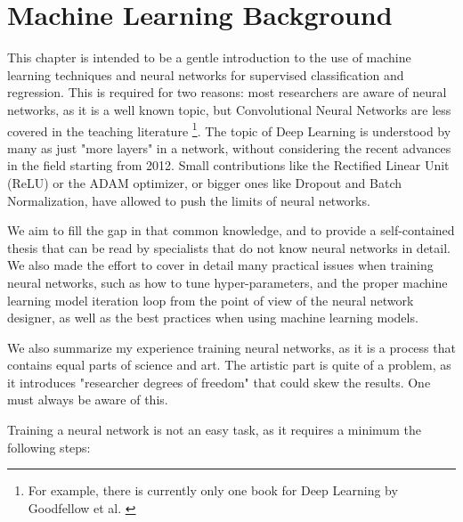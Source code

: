 \chapter{Machine Learning Background}
\label{chapter:background}

This chapter is intended to be a gentle introduction to the use of machine learning techniques and neural networks for supervised classification and regression. This is required for two reasons: most researchers are aware of neural networks, as it is a well known topic, but Convolutional Neural Networks are less covered in the teaching literature \footnote{For example, there is currently only one book for Deep Learning by Goodfellow et al. \cite{Goodfellow2016deep}}. The topic of Deep Learning is understood by many as just "more layers" in a network, without considering the recent advances in the field starting from 2012. Small contributions like the Rectified Linear Unit (ReLU) or the ADAM optimizer, or bigger ones like Dropout and Batch Normalization, have allowed to push the limits of neural networks.

We aim to fill the gap in that common knowledge, and to provide a self-contained thesis that can be read by specialists that do not know neural networks in detail. We also made the effort to cover in detail many practical issues when training neural networks, such as how to tune hyper-parameters, and the proper machine learning model iteration loop from the point of view of the neural network designer, as well as the best practices when using machine learning models.

We also summarize my experience training neural networks, as it is a process that contains equal parts of science and art. The artistic part is quite of a problem, as it introduces "researcher degrees of freedom" that could skew the results. One must always be aware of this.

Training a neural network is not an easy task, as it requires a minimum the following steps:

